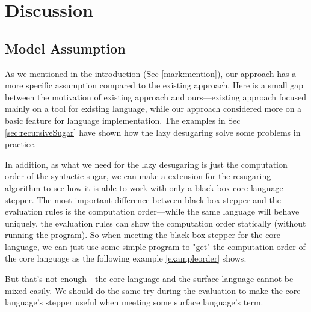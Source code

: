 \section{Discussion}
\label{sec5}

\subsection{Model Assumption}


As we mentioned in the introduction (Sec \ref{mark:mention}), our approach has a more specific assumption compared to the existing approach. Here is a small gap between the motivation of existing approach and ours---existing approach focused mainly on a tool for existing language, while our approach considered more on a basic feature for language implementation. The examples in Sec \ref{sec:recursiveSugar} have shown how the lazy desugaring solve some problems in practice.

In addition, as what we need for the lazy desugaring is just the computation order of the syntactic sugar, we can make a extension for the resugaring algorithm to see how it is able to work with only a black-box core language stepper. The most important difference between black-box stepper and the evaluation rules is the computation order---while the same language will behave uniquely, the evaluation rules can show the computation order statically (without running the program). So when meeting the black-box stepper for the core language, we can just use some simple program to "get" the computation order of the core language as the following example \ref{exampleorder} shows.



But that's not enough---the core language and the surface language cannot be mixed easily. We should do the same try during the evaluation to make the core language's stepper useful when meeting some surface language's term.


